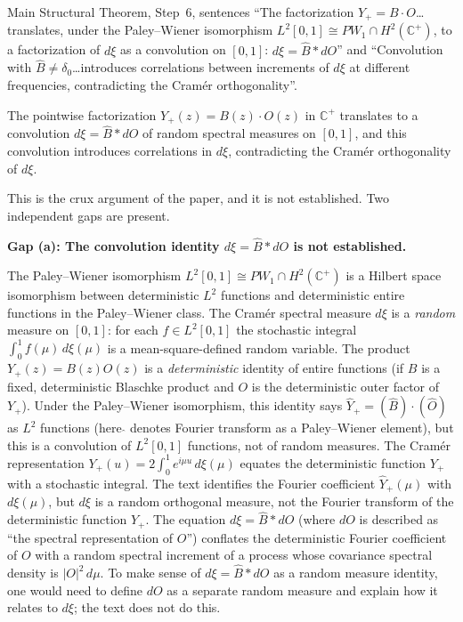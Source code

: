 \documentclass[11pt]{article}
\newcommand{\C}{\mathbb{C}}
\begin{document}
\begin{description}[leftmargin=0pt]
\item[Location:]
Main Structural Theorem, Step~6, sentences
``The factorization $Y_+=B\cdot O$\ldots translates, under the Paley--Wiener
isomorphism $L^2[0,1]\cong PW_1\cap H^2(\C^+)$, to a factorization of $d\xi$ as
a convolution on $[0,1]$: $d\xi=\hat B\ast dO$'' and
``Convolution with $\hat B\ne\delta_0$\ldots introduces correlations between
increments of $d\xi$ at different frequencies, contradicting the Cram\'{e}r
orthogonality''.

\item[Claim as written:]
The pointwise factorization $Y_+(z)=B(z)\cdot O(z)$ in $\C^+$ translates to a
convolution $d\xi=\hat B\ast dO$ of random spectral measures on $[0,1]$, and this
convolution introduces correlations in $d\xi$, contradicting the Cram\'{e}r
orthogonality of $d\xi$.

\item[What is relied on but not established in the text:]
This is the crux argument of the paper, and it is not established.
Two independent gaps are present.

\smallskip
\noindent\textbf{Gap (a): The convolution identity $d\xi=\hat B\ast dO$ is not established.}

The Paley--Wiener isomorphism $L^2[0,1]\cong PW_1\cap H^2(\C^+)$ is a Hilbert
space isomorphism between deterministic $L^2$ functions and deterministic entire
functions in the Paley--Wiener class.
The Cram\'{e}r spectral measure $d\xi$ is a \emph{random} measure on $[0,1]$: for
each $f\in L^2[0,1]$ the stochastic integral $\int_0^1 f(\mu)\,d\xi(\mu)$
is a mean-square-defined random variable.
The product $Y_+(z)=B(z)O(z)$ is a \emph{deterministic} identity of entire
functions (if $B$ is a fixed, deterministic Blaschke product and $O$ is the
deterministic outer factor of $Y_+$).
Under the Paley--Wiener isomorphism, this identity says
$\hat Y_+=(\hat B)\cdot(\hat O)$ as $L^2$ functions (here $\hat{}$ denotes
Fourier transform as a Paley--Wiener element), but this is a convolution of
$L^2[0,1]$ functions, not of random measures.
The Cram\'{e}r representation $Y_+(u)=2\int_0^1 e^{i\mu u}\,d\xi(\mu)$
equates the deterministic function $Y_+$ with a stochastic integral.
The text identifies the Fourier coefficient $\hat Y_+(\mu)$ with $d\xi(\mu)$, but
$d\xi$ is a random orthogonal measure, not the Fourier transform of the
deterministic function $Y_+$.
The equation $d\xi=\hat B\ast dO$ (where $dO$ is described as ``the spectral
representation of $O$'') conflates the deterministic Fourier coefficient of $O$
with a random spectral increment of a process whose covariance spectral density
is $|O|^2\,d\mu$.
To make sense of $d\xi=\hat B\ast dO$ as a random measure identity, one would
need to define $dO$ as a separate random measure and explain how it relates to
$d\xi$; the text does not do this.


\end{description}
\end{document}
